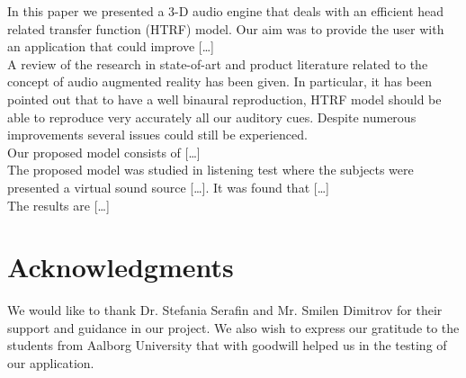 \documentclass[journal]{IEEEtran}
\begin{document}
In this paper we presented a 3-D audio engine that deals with an efficient head related transfer function (HTRF) model. Our aim was to provide the user with an application that could improve […] \\
A review of the research in state-of-art and product literature related to the concept of audio augmented reality has been given. In particular, it has been pointed out that to have a well binaural reproduction, HTRF model should be able to reproduce very accurately all our auditory cues. Despite numerous improvements several issues could still be experienced. \\
Our proposed model consists of […] \\
The proposed model was studied in listening test where the subjects were presented a virtual sound source […]. It was found that […] \\
The results are […]

\section*{Acknowledgments}

We would like to thank Dr. Stefania Serafin and Mr. Smilen Dimitrov for their support and guidance in our project. We also wish to express our gratitude to the students from Aalborg University that with goodwill helped us in the testing of our application.








\end{document}
